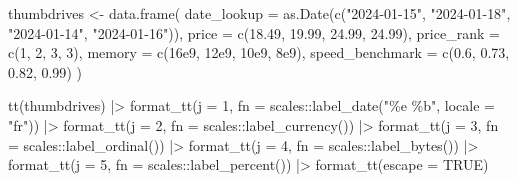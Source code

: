 \documentclass[
  letterpaper,
  DIV=11,
  numbers=noendperiod]{scrartcl}
\newenvironment{Shaded}{\begin{snugshade}}{\end{snugshade}}
\newcommand{\AttributeTok}[1]{\textcolor[rgb]{0.40,0.45,0.13}{#1}}
\newcommand{\ConstantTok}[1]{\textcolor[rgb]{0.56,0.35,0.01}{#1}}
\newcommand{\DecValTok}[1]{\textcolor[rgb]{0.68,0.00,0.00}{#1}}
\newcommand{\FloatTok}[1]{\textcolor[rgb]{0.68,0.00,0.00}{#1}}
\newcommand{\FunctionTok}[1]{\textcolor[rgb]{0.28,0.35,0.67}{#1}}
\newcommand{\NormalTok}[1]{\textcolor[rgb]{0.00,0.23,0.31}{#1}}
\newcommand{\OtherTok}[1]{\textcolor[rgb]{0.00,0.23,0.31}{#1}}
\newcommand{\SpecialCharTok}[1]{\textcolor[rgb]{0.37,0.37,0.37}{#1}}
\newcommand{\StringTok}[1]{\textcolor[rgb]{0.13,0.47,0.30}{#1}}
\begin{document}
\begin{Shaded}
\begin{Highlighting}[]
\NormalTok{thumbdrives }\OtherTok{\textless{}{-}} \FunctionTok{data.frame}\NormalTok{(}
  \AttributeTok{date\_lookup =} \FunctionTok{as.Date}\NormalTok{(}\FunctionTok{c}\NormalTok{(}\StringTok{"2024{-}01{-}15"}\NormalTok{, }\StringTok{"2024{-}01{-}18"}\NormalTok{, }\StringTok{"2024{-}01{-}14"}\NormalTok{, }\StringTok{"2024{-}01{-}16"}\NormalTok{)),}
  \AttributeTok{price =} \FunctionTok{c}\NormalTok{(}\FloatTok{18.49}\NormalTok{, }\FloatTok{19.99}\NormalTok{, }\FloatTok{24.99}\NormalTok{, }\FloatTok{24.99}\NormalTok{),}
  \AttributeTok{price\_rank =} \FunctionTok{c}\NormalTok{(}\DecValTok{1}\NormalTok{, }\DecValTok{2}\NormalTok{, }\DecValTok{3}\NormalTok{, }\DecValTok{3}\NormalTok{),}
  \AttributeTok{memory =} \FunctionTok{c}\NormalTok{(}\FloatTok{16e9}\NormalTok{, }\FloatTok{12e9}\NormalTok{, }\FloatTok{10e9}\NormalTok{, }\FloatTok{8e9}\NormalTok{),}
  \AttributeTok{speed\_benchmark =} \FunctionTok{c}\NormalTok{(}\FloatTok{0.6}\NormalTok{, }\FloatTok{0.73}\NormalTok{, }\FloatTok{0.82}\NormalTok{, }\FloatTok{0.99}\NormalTok{)}
\NormalTok{)}

\FunctionTok{tt}\NormalTok{(thumbdrives) }\SpecialCharTok{|\textgreater{}}
  \FunctionTok{format\_tt}\NormalTok{(}\AttributeTok{j =} \DecValTok{1}\NormalTok{, }\AttributeTok{fn =}\NormalTok{ scales}\SpecialCharTok{::}\FunctionTok{label\_date}\NormalTok{(}\StringTok{"\%e \%b"}\NormalTok{, }\AttributeTok{locale =} \StringTok{"fr"}\NormalTok{)) }\SpecialCharTok{|\textgreater{}}
  \FunctionTok{format\_tt}\NormalTok{(}\AttributeTok{j =} \DecValTok{2}\NormalTok{, }\AttributeTok{fn =}\NormalTok{ scales}\SpecialCharTok{::}\FunctionTok{label\_currency}\NormalTok{()) }\SpecialCharTok{|\textgreater{}}
  \FunctionTok{format\_tt}\NormalTok{(}\AttributeTok{j =} \DecValTok{3}\NormalTok{, }\AttributeTok{fn =}\NormalTok{ scales}\SpecialCharTok{::}\FunctionTok{label\_ordinal}\NormalTok{()) }\SpecialCharTok{|\textgreater{}} 
  \FunctionTok{format\_tt}\NormalTok{(}\AttributeTok{j =} \DecValTok{4}\NormalTok{, }\AttributeTok{fn =}\NormalTok{ scales}\SpecialCharTok{::}\FunctionTok{label\_bytes}\NormalTok{()) }\SpecialCharTok{|\textgreater{}} 
  \FunctionTok{format\_tt}\NormalTok{(}\AttributeTok{j =} \DecValTok{5}\NormalTok{, }\AttributeTok{fn =}\NormalTok{ scales}\SpecialCharTok{::}\FunctionTok{label\_percent}\NormalTok{())  }\SpecialCharTok{|\textgreater{}}
  \FunctionTok{format\_tt}\NormalTok{(}\AttributeTok{escape =} \ConstantTok{TRUE}\NormalTok{)}
\end{Highlighting}
\end{Shaded}
\end{document}
